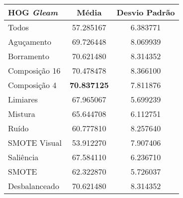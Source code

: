 
\begin{table}[!htbp]
\centering
\caption{}
\label{tab:resultados:x:melhor}
\begin{tabular}{|l|c|c|}
\hline
\textbf{HOG \emph{Gleam}} & \textbf{Média}     & \textbf{Desvio Padrão} \\ \hline
   Todos        &  57.285167 &  6.383771  \\ \hline
  Aguçamento    &  69.726448 &  8.069939  \\ \hline
  Borramento    &  70.621480 &  8.314352  \\ \hline
  Composição 16 &  70.478478 &  8.366100  \\ \hline
  Composição 4  &  \textbf{70.837125} &  7.811876  \\ \hline
  Limiares      &  67.965067 &  5.699239  \\ \hline
  Mistura       &  65.644708 &  6.112751  \\ \hline
  Ruído         &  60.777810 &  8.257640  \\ \hline
  SMOTE Visual  &  53.912270 &  7.907406  \\ \hline
  Saliência     &  67.584110 &  6.236710  \\ \hline
 SMOTE          &  62.322870 &  5.726037  \\ \hline
Desbalanceado   &  70.621480 &  8.314352  \\ \hline
\end{tabular}
\end{table}

